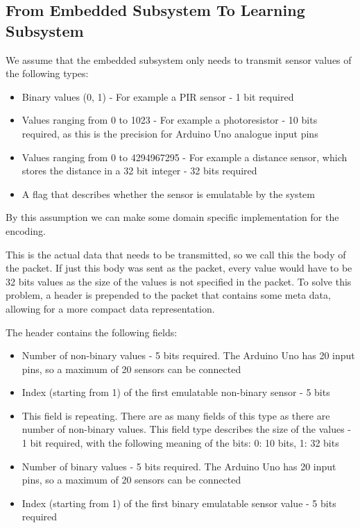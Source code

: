 \subsection{From Embedded Subsystem To Learning Subsystem}
We assume that the embedded subsystem only needs to transmit sensor values of the following types:

\begin{itemize}
\item Binary values (0, 1) - For example a PIR sensor - 1 bit required
\item Values ranging from 0 to 1023 - For example a photoresistor - 10 bits required, as this is the precision for Arduino Uno analogue input pins
\item Values ranging from 0 to 4294967295 - For example a distance sensor, which stores the distance in a 32 bit integer - 32 bits required
\item A flag that describes whether the sensor is emulatable by the system
\end{itemize}
By this assumption we can make some domain specific implementation for the encoding.

This is the actual data that needs to be transmitted, so we call this the body of the packet. If just this body was sent as the packet, every value would have to be 32 bits values as the size of the values is not specified in the packet. To solve this problem, a header is prepended to the packet that contains some meta data, allowing for a more compact data representation.

The header contains the following fields:

\begin{itemize}
\item Number of non-binary values - 5 bits required. The Arduino Uno has 20 input pins, so a maximum of 20 sensors can be connected
\item Index (starting from 1) of the first emulatable non-binary sensor - 5 bits
\item This field is repeating. There are as many fields of this type as there are number of non-binary values. This field type describes the size of the values - 1 bit required, with the following meaning of the bits: 0: 10 bits, 1: 32 bits
\item Number of binary values - 5 bits required. The Arduino Uno has 20 input pins, so a maximum of 20 sensors can be connected
\item Index (starting from 1) of the first binary emulatable sensor value - 5 bits required
\end{itemize}

